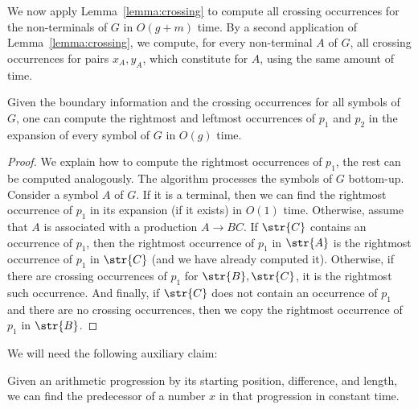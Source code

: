 We now apply Lemma~\ref{lemma:crossing} to compute all crossing occurrences for the non-terminals of $G$ in $O(g+m)$ time. By a second application of Lemma~\ref{lemma:crossing}, we compute, for every non-terminal $A$ of $G$, all crossing occurrences for pairs $x_A,y_A$, which constitute  for $A$, using the same amount of time. 

\begin{proposition}
Given the boundary information and the crossing occurrences for all symbols of $G$, one can compute the rightmost and leftmost occurrences of $p_1$ and $p_2$ in the expansion of every symbol of $G$ in $O(g)$ time. 
\end{proposition}
\begin{proof}
We explain how to compute the rightmost occurrences of $p_1$, the rest can be computed analogously. The algorithm processes the symbols of $G$ bottom-up. Consider a symbol $A$ of $G$. If it is a terminal, then we can find the rightmost occurrence of $p_1$ in its expansion (if it exists) in $O(1)$ time. Otherwise, assume that $A$ is associated with a production $A \rightarrow BC$. If $\str{C}$ contains an occurrence of $p_1$, then the rightmost occurrence of $p_1$ in $\str{A}$ is the rightmost occurrence of $p_1$ in $\str{C}$ (and we have already computed it). Otherwise, if there are crossing occurrences of $p_1$ for $\str{B}, \str{C}$, it is the rightmost such occurrence. And finally, if $\str{C}$ does not contain an occurrence of $p_1$ and there are no crossing occurrences, then we copy the rightmost occurrence of $p_1$ in $\str{B}$. 

\end{proof} 

We will need the following auxiliary claim:

\begin{observation}\label{obs:arithmetic_predecessor}
Given an arithmetic progression by its starting position, difference, and  length, we can find the predecessor of a number $x$ in that progression in constant time.
\end{observation}
    
